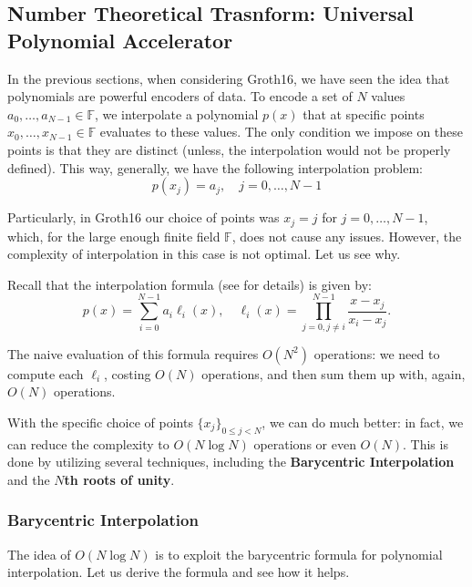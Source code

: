 \documentclass[../../book.tex]{subfiles}
\begin{document}
\subsection[Number Theoretical Trasnform]{Number Theoretical Trasnform: Universal Polynomial Accelerator}\label{section:ntt}

In the previous sections, when considering Groth16, we have seen the idea that
polynomials are powerful encoders of data. To encode a set of $N$ values
$a_0,\dots,a_{N-1} \in \mathbb{F}$, we interpolate a polynomial $p(x)$ that at
specific points $x_0,\dots,x_{N-1} \in \mathbb{F}$ evaluates to these values. The
only condition we impose on these points is that they are distinct (unless, the
interpolation would not be properly defined). This way, generally, we have the
following interpolation problem:
\begin{equation*}
    p(x_j) = a_j, \quad j = 0,\dots,N-1
\end{equation*}

Particularly, in Groth16 our choice of points was $x_j = j$ for $j = 0,\dots,N-1$, which, 
for the large enough finite field $\mathbb{F}$, does not cause any issues. However, the 
complexity of interpolation in this case is not optimal. Let us see why.

Recall that the interpolation formula (see  for details)
is given by:
\begin{equation*}
    p(x) = \sum_{i=0}^{N-1} a_i \ell_i(x), \quad \ell_i(x) = \prod_{j=0, j \neq i}^{N-1} \frac{x-x_j}{x_i-x_j}.
\end{equation*}

The naive evaluation of this formula requires $O(N^2)$ operations: we
need to compute each $\ell_i$, costing $O(N)$ operations, and then sum
them up with, again, $O(N)$ operations.

With the specific choice of points $\{x_j\}_{0 \leq j < N}$, we can do much
better: in fact, we can reduce the complexity to $O(N \log N)$ operations or
even $O(N)$. This is done by utilizing several techniques, including the
\textbf{Barycentric Interpolation} and the \textbf{$N$th roots of unity}. 

\subsubsection{Barycentric Interpolation}

The idea of $O(N \log N)$ is to exploit the barycentric formula for polynomial
interpolation. Let us derive the formula and see how it helps.
\end{document}
